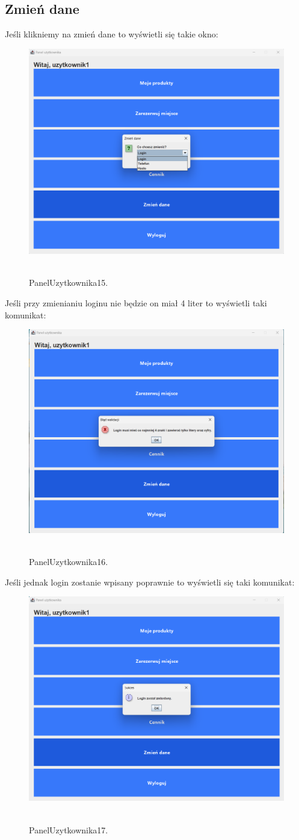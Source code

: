 \subsection{Zmień dane}
\label{subsec:Zmień dane}
Jeśli klikniemy na zmień dane to wyświetli się takie okno:
\begin{figure}[H]
    \centering
    \includegraphics[width=.7\linewidth]{figures/PanelUzytkownika15.png}\
    \caption{PanelUzytkownika15.\label{PanelUzytkownika15}}
\end{figure}
Jeśli przy zmienianiu loginu nie będzie on miał 4 liter to wyświetli taki komunikat:
\begin{figure}[H]
    \centering
    \includegraphics[width=.7\linewidth]{figures/PanelUzytkownika16.png}\
    \caption{PanelUzytkownika16.\label{PanelUzytkownika16}}
\end{figure}
Jeśli jednak login zostanie wpisany poprawnie to wyświetli się taki komunikat:
\begin{figure}[H]
    \centering
    \includegraphics[width=.7\linewidth]{figures/PanelUzytkownika17.png}\
    \caption{PanelUzytkownika17.\label{PanelUzytkownika17}}
\end{figure}
